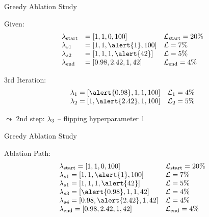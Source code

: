 \begin{frame}[c]{Greedy Ablation Study}

Given:
\begin{eqnarray}
\begin{array}{lll}
\conf_{\text{start}} &= [1, 1, 0, 100] & \loss_{\text{start}} = 20\% \nonumber\\
\conf_{s1} &= [1, 1, \alert{1}, 100]  & \loss = 7\% \nonumber\\
\conf_{s2} &= [1, 1, 1, \alert{42}]  & \loss = 5\% \nonumber\\
\conf_{\text{end}} &= [0.98, 2.42, 1, 42]  & \loss_{\text{end}} = 4\% \nonumber
\end{array}
\end{eqnarray}

3rd Iteration:
\begin{eqnarray}
\begin{array}{ll}
\conf_1 = [\alert{0.98}, 1, 1, 100] & \loss_1 = 4\% \nonumber\\
\conf_2 = [1, \alert{2.42}, 1, 100] & \loss_2 = 5\% \nonumber\\
\end{array}
\end{eqnarray}

$\leadsto$ 2nd step: $\mathbf{\lambda}_3$ -- flipping hyperparameter 1

\end{frame}
\begin{frame}[c]{Greedy Ablation Study}

Ablation Path:
\begin{eqnarray}
\begin{array}{ll}
\conf_{\text{start}} = [1, 1, 0, 100] & \loss_{\text{start}} = 20\% \nonumber\\
\conf_{s1} = [1, 1, \alert{1}, 100]  & \loss = 7\% \nonumber\\
\conf_{s1} = [1, 1, 1, \alert{42}]  & \loss = 5\% \nonumber\\
\conf_{s3} = [\alert{0.98}, 1, 1, 42] & \loss = 4\% \nonumber\\
\conf_{s4} = [0.98, \alert{2.42}, 1, 42] & \loss = 4\% \nonumber\\
\conf_{\text{end}} = [0.98, 2.42, 1, 42]  & \loss_{\text{end}} = 4\% \nonumber
\end{array}
\end{eqnarray}

\end{frame}
